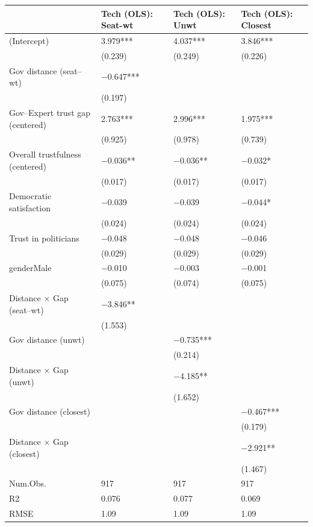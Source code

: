\begin{tabular}{llll}
\hline
& Tech (OLS): Seat-wt & Tech (OLS): Unwt & Tech (OLS): Closest \\ \hline
(Intercept) & \num{3.979}*** & \num{4.037}*** & \num{3.846}*** \\
& (\num{0.239}) & (\num{0.249}) & (\num{0.226}) \\
Gov distance (seat--wt) & \num{-0.647}*** &  &  \\
& (\num{0.197}) &  &  \\
Gov--Expert trust gap (centered) & \num{2.763}*** & \num{2.996}*** & \num{1.975}*** \\
& (\num{0.925}) & (\num{0.978}) & (\num{0.739}) \\
Overall trustfulness (centered) & \num{-0.036}** & \num{-0.036}** & \num{-0.032}* \\
& (\num{0.017}) & (\num{0.017}) & (\num{0.017}) \\
Democratic satisfaction & \num{-0.039} & \num{-0.039} & \num{-0.044}* \\
& (\num{0.024}) & (\num{0.024}) & (\num{0.024}) \\
Trust in politicians & \num{-0.048} & \num{-0.048} & \num{-0.046} \\
& (\num{0.029}) & (\num{0.029}) & (\num{0.029}) \\
genderMale & \num{-0.010} & \num{-0.003} & \num{-0.001} \\
& (\num{0.075}) & (\num{0.074}) & (\num{0.075}) \\
Distance $\times$ Gap (seat--wt) & \num{-3.846}** &  &  \\
& (\num{1.553}) &  &  \\
Gov distance (unwt) &  & \num{-0.735}*** &  \\
&  & (\num{0.214}) &  \\
Distance $\times$ Gap (unwt) &  & \num{-4.185}** &  \\
&  & (\num{1.652}) &  \\
Gov distance (closest) &  &  & \num{-0.467}*** \\
&  &  & (\num{0.179}) \\
Distance $\times$ Gap (closest) &  &  & \num{-2.921}** \\
&  &  & (\num{1.467}) \\
Num.Obs. & \num{917} & \num{917} & \num{917} \\
R2 & \num{0.076} & \num{0.077} & \num{0.069} \\
RMSE & \num{1.09} & \num{1.09} & \num{1.09} \\
\hline
\end{tabular}

